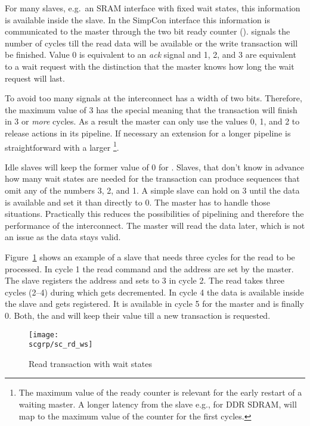 For many slaves, e.g.\ an SRAM interface with fixed wait states,
this information is available inside the slave. In the SimpCon
interface this information is communicated to the master through the
two bit ready counter ().  signals the
number of cycles till the read data will be available or the write
transaction will be finished. Value 0 is equivalent to an \emph{ack}
signal and 1, 2, and 3 are equivalent to a wait request with the
distinction that the master knows how long the wait request will
last.

To avoid too many signals at the interconnect  has a
width of two bits. Therefore, the maximum value of 3 has the special
meaning that the transaction will finish in 3 or \emph{more} cycles.
As a result the master can only use the values 0, 1, and 2 to
release actions in its pipeline. If necessary an extension for a
longer pipeline is straightforward with a larger
\footnote{The maximum value of the ready counter is
relevant for the early restart of a waiting master. A longer latency
from the slave e.g., for DDR SDRAM, will map to the maximum value of
the counter for the first cycles.}.

Idle slaves will keep the former value of 0 for .
Slaves, that don't know in advance how many wait states are needed
for the transaction can produce sequences that omit any of the
numbers 3, 2, and 1. A simple slave can hold  on 3
until the data is available and set it than directly to 0. The
master has to handle those situations. Practically this reduces the
possibilities of pipelining and therefore the performance of the
interconnect. The master will read the data later, which is not an
issue as the data stays valid.

Figure~\ref{fig:sc:rd:ws} shows an example of a slave that needs
three cycles for the read to be processed. In cycle 1 the read
command and the address are set by the master. The slave registers
the address and sets  to 3 in cycle 2. The read takes
three cycles (2--4) during which  gets decremented.
In cycle 4 the data is available inside the slave and gets
registered. It is available in cycle 5 for the master and
 is finally 0. Both, the  and
 will keep their value till a new transaction is
requested.

\begin{figure}
    \centering
    \texttt{[image: \\scgrp/sc\_rd\_ws]}
    \caption{Read transaction with wait states}
    \label{fig:sc:rd:ws}
\end{figure}


